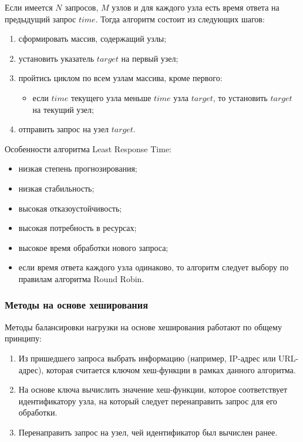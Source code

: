 Если имеется $N$ запросов, $M$ узлов и для каждого узла есть время ответа на предыдущий запрос $time$.
Тогда алгоритм состоит из следующих шагов:

\begin{enumerate}
	\item сформировать массив, содержащий узлы;
	\item установить указатель $target$ на первый узел;
	\item пройтись циклом по всем узлам массива, кроме первого:
	\begin{itemize}
		\item если $time$ текущего узла меньше $time$ узла $target$, то установить $target$ на текущий узел; 
	\end{itemize}
	\item отправить запрос на узел $target$.
\end{enumerate}

Особенности алгоритма Least Response Time:
\begin{itemize}
	\item низкая степень прогнозирования; 
	\item низкая стабильность;
	\item высокая отказоустойчивость;
	\item высокая потребность в ресурсах;
	\item высокое время обработки нового запроса;
	\item если время ответа каждого узла одинаково, то алгоритм следует выбору по правилам алгоритма Round Robin.
\end{itemize}

\subsubsection{Методы на основе хеширования}

Методы балансировки нагрузки на основе хеширования работают по общему принципу:
\begin{enumerate}
	\item Из пришедшего запроса выбрать информацию (например, IP-адрес или URL-адрес), которая считается ключом хеш-функции в рамках данного алгоритма.
	\item На основе ключа вычислить значение хеш-функции, которое соответствует идентификатору узла, на который следует перенаправить запрос для его обработки.
	\item Перенаправить запрос на узел, чей идентификатор был вычислен ранее.
\end{enumerate}

